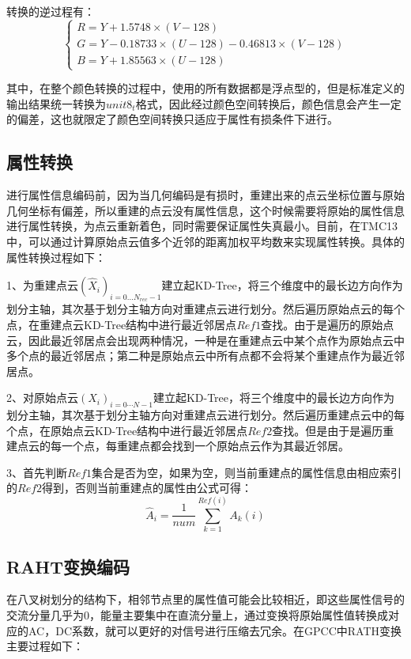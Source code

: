 \documentclass[bachelor,print,msfonts]{xduthesis}
\begin{document}
转换的逆过程有：
\begin{equation}
    \left\{\begin{array}{c}
        R=Y+1.5748 \times(V-128)                        \\
        G=Y-0.18733 \times(U-128)-0.46813 \times(V-128) \\
        B=Y+1.85563 \times(U-128)
    \end{array}\right.
\end{equation}

其中，在整个颜色转换的过程中，使用的所有数据都是浮点型的，但是标准定义的输出结果统一转换为$unit8_t$格式，因此经过颜色空间转换后，颜色信息会产生一定的偏差，这也就限定了颜色空间转换只适应于属性有损条件下进行。

\subsection{属性转换}
进行属性信息编码前，因为当几何编码是有损时，重建出来的点云坐标位置与原始几何坐标有偏差，所以重建的点云没有属性信息，这个时候需要将原始的属性信息进行属性转换，为点云重新着色，同时需要保证属性失真最小。目前，在TMC13中，可以通过计算原始点云值多个近邻的距离加权平均数来实现属性转换。具体的属性转换过程如下：

1、为重建点云$(\widehat{X}_{i})_{i=0 \ldots  N_{r e c}-1}$建立起KD-Tree，将三个维度中的最长边方向作为划分主轴，其次基于划分主轴方向对重建点云进行划分。然后遍历原始点云的每个点，在重建点云KD-Tree结构中进行最近邻居点$Ref1$查找。由于是遍历的原始点云，因此最近邻居点会出现两种情况，一种是在重建点云中某个点作为原始点云中多个点的最近邻居点；第二种是原始点云中所有点都不会将某个重建点作为最近邻居点。

2、对原始点云$(X_{i})_{i=0\cdots N-1}$建立起KD-Tree，将三个维度中的最长边方向作为划分主轴，其次基于划分主轴方向对重建点云进行划分。然后遍历重建点云中的每个点，在原始点云KD-Tree结构中进行最近邻居点$Ref2$查找。但是由于是遍历重建点云的每一个点，每重建点都会找到一个原始点云作为其最近邻居。

3、首先判断$Ref1$集合是否为空，如果为空，则当前重建点的属性信息由相应索引的$Ref2$得到，否则当前重建点的属性由公式可得：
\begin{equation}
    \hat{A}_{i}=\frac{1}{num} \sum_{k=1}^{Ref(i)} A_{k}(i)
\end{equation}

\subsection{RAHT变换编码}
在八叉树划分的结构下，相邻节点里的属性值可能会比较相近，即这些属性信号的交流分量几乎为0，能量主要集中在直流分量上，通过变换将原始属性值转换成对应的AC，DC系数，就可以更好的对信号进行压缩去冗余。在GPCC中RATH变换\cite{ref21}主要过程如下：
\end{document}
